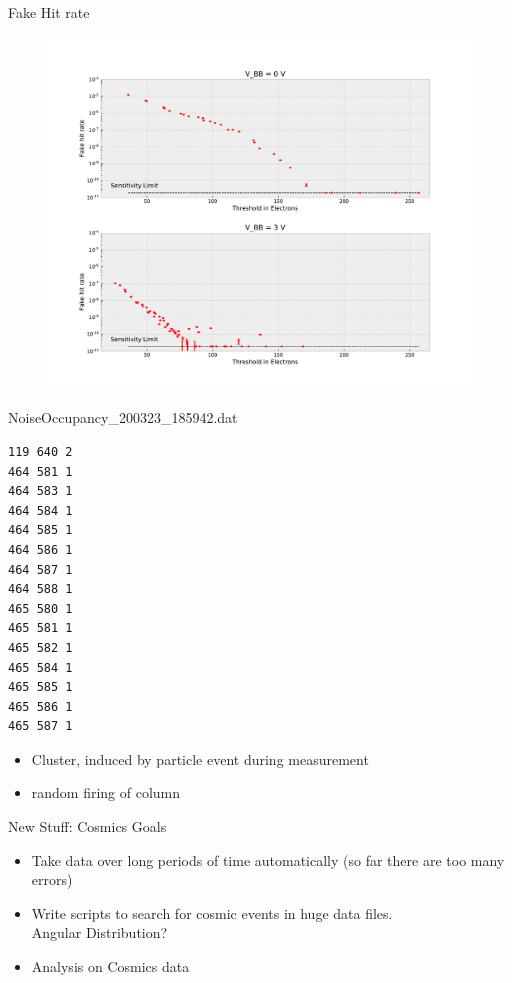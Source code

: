 \begin{frame}[fragile]{Fake Hit rate}
    \begin{minipage}{.7\textwidth}
    \begin{figure}[H]
	\centering
	\includegraphics[width=\textwidth]{../Fake_Hit_Rate.pdf}
    \end{figure}
    \end{minipage}
    \pause
    \begin{minipage}{.29\textwidth}
	\tiny
	NoiseOccupancy\_200323\_185942.dat
\begin{lstlisting}
119 640 2
464 581 1
464 583 1
464 584 1
464 585 1
464 586 1
464 587 1
464 588 1
465 580 1
465 581 1
465 582 1
465 584 1
465 585 1
465 586 1
465 587 1
\end{lstlisting}
\begin{itemize}
    \item Cluster, induced by particle event during measurement
    \item random firing of column
\end{itemize}
    \end{minipage}
\end{frame}

\begin{frame}{New Stuff: Cosmics}
    \Large Goals \\
    \normalsize
    \begin{itemize}
	\item Take data over long periods of time automatically (so far there
	    are too many errors)
	    \pause
	\item Write scripts to search for cosmic events in huge data files.\\
	    \small Angular Distribution?
	    \pause
	\item \normalsize Analysis on Cosmics data
    \end{itemize}
\end{frame}
